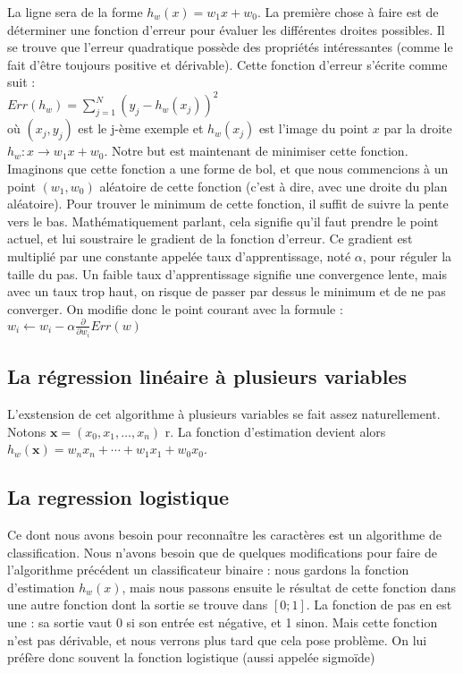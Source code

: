 La ligne sera de la forme $h_w(x) = w_1x + w_0$. La première chose à faire est de déterminer une fonction d'erreur pour évaluer les différentes droites possibles. Il se trouve que l'erreur quadratique possède des propriétés intéressantes (comme le fait d'être toujours positive et dérivable). Cette fonction d'erreur s'écrite comme suit :\\
$Err(h_w) = \sum\limits_{j=1}^{N}(y_j - h_w(x_j))^{2}$\\
où $(x_j, y_j)$ est le j-ème exemple et $h_w(x_j)$ est l'image du point $x$ par la droite $h_w : x \rightarrow w_1x + w_0$. Notre but est maintenant de minimiser cette fonction. Imaginons que cette fonction a une forme de bol, et que nous commencions à un point $(w_1, w_0)$ aléatoire de cette fonction (c'est à dire, avec une droite du plan aléatoire). Pour trouver le minimum de cette fonction, il suffit de suivre la pente vers le bas. Mathématiquement parlant, cela signifie qu'il faut prendre le point actuel, et lui soustraire le gradient de la fonction d'erreur. Ce gradient est multiplié par une constante appelée taux d'apprentissage, noté $\alpha$, pour réguler la taille du pas. Un faible taux d'apprentissage signifie une convergence lente, mais avec un taux trop haut, on risque de passer par dessus le minimum et de ne pas converger. On modifie donc le point courant avec la formule :\\

$w_i \leftarrow w_i - \alpha \frac{\partial}{\partial w_i} Err(w)$\\

\subsection{La régression linéaire à plusieurs variables}

L'exstension de cet algorithme à plusieurs variables se fait assez naturellement. Notons $\textbf{x} = (x_0, x_1, \ldots, x_n)$ r. La fonction d'estimation devient alors $h_w(\textbf{x}) = w_nx_n + \cdots + w_1x_1 + w_0x_0$.

\subsection{La regression logistique}

Ce dont nous avons besoin pour reconnaître les caractères est un algorithme de classification. Nous n'avons besoin que de quelques modifications pour faire de l'algorithme précédent un classificateur binaire : nous gardons la fonction d'estimation $h_w(x)$, mais nous passons ensuite le résultat de cette fonction dans une autre fonction dont la sortie se trouve dans $[0;1]$.  La fonction de pas en est une : sa sortie vaut 0 si son entrée est négative, et 1 sinon. Mais cette fonction n'est pas dérivable, et nous verrons plus tard que cela pose problème. On lui préfère donc souvent la fonction logistique (aussi appelée sigmoïde)\\

